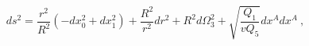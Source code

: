 \begin{equation}
 ds^2 = \frac{r^2}{R^2} (- d x_0^2 + d x_1^2) 
       +  \frac{R^2}{r^2} d r^2 + R^2 d\Omega_3^2 
       + \sqrt{\frac{Q_1}{vQ_5}} dx^A dx^A ~,
\end{equation}

